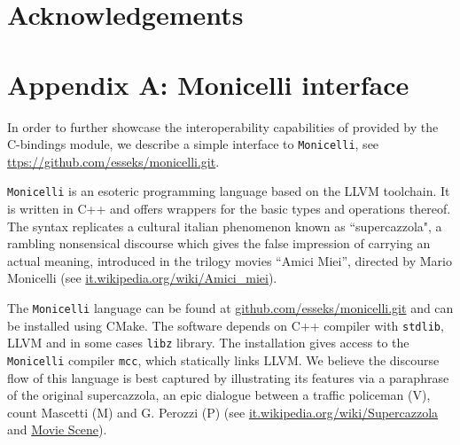 \documentclass[edipack2.tex]{subfiles}
\begin{document}

\section*{Acknowledgements}


\section{Appendix A: Monicelli interface}\label{appendixA}
In order to further showcase the interoperability capabilities of
\NAME provided by the C-bindings module, we describe a simple interface to {\tt Monicelli}, see
\href{github.com/esseks/monicelli.git}{ttps://github.com/esseks/monicelli.git}. 

  
{\tt Monicelli} is an esoteric programming language based on the LLVM
toolchain.
It is written in C++ and offers wrappers for the basic
types and operations thereof. The syntax replicates a cultural italian
phenomenon known as ``supercazzola", a rambling nonsensical discourse
which gives the false impression of carrying an actual meaning,
introduced in the trilogy movies ``Amici Miei'', directed by Mario
Monicelli (see
\href{https://it.wikipedia.org/wiki/Amici_miei}{it.wikipedia.org/wiki/Amici\_miei}). 

The {\tt Monicelli} language can be found at
\href{https://github.com/esseks/monicelli.git}{github.com/esseks/monicelli.git}
and can be installed using CMake. The software depends on C++
compiler with {\tt stdlib}, LLVM and in some cases {\tt libz} library. The installation gives access to the {\tt
  Monicelli} compiler {\tt mcc}, which statically links LLVM. 
We believe the discourse flow of this language is best captured by 
illustrating its features via a paraphrase of the original supercazzola, an epic dialogue between a traffic policeman (V), count Mascetti (M) and G. Perozzi (P) (see
\href{https://it.wikipedia.org/wiki/Supercazzola#Origine}{it.wikipedia.org/wiki/Supercazzola}
and \href{https://www.youtube.com/watch?v=SF8YUFdP6eU}{Movie Scene}). 
\end{document}

